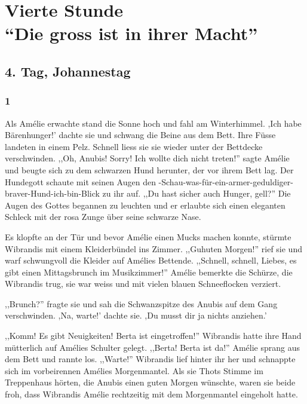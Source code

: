 \documentclass[11pt,titlepage,a5paper]{book}
\begin{document}
\part*{Vierte Stunde\\"`Die gross ist in ihrer Macht"'}

\chapter*{4. Tag, Johannestag}

\section*{1}

Als Amélie erwachte stand die Sonne hoch und fahl am Winterhimmel. ,Ich habe Bärenhunger!' dachte sie und schwang die Beine aus dem Bett. Ihre Füsse landeten in einem Pelz. Schnell liess sie sie wieder unter der Bettdecke verschwinden. ,,Oh, Anubis! Sorry! Ich wollte dich nicht treten!''  sagte Amélie und beugte sich zu dem schwarzen Hund herunter, der vor ihrem Bett lag. Der Hundegott schaute mit seinen Augen den -Schau-was-für-ein-armer-geduldiger-braver-Hund-ich-bin-Blick zu ihr auf. ,,Du hast sicher auch Hunger, gell?'' Die Augen des Gottes begannen zu leuchten und er erlaubte sich einen eleganten Schleck mit der rosa Zunge über seine schwarze Nase.

Es klopfte an der Tür und bevor Amélie einen Mucks machen konnte, stürmte Wibrandis mit einem Kleiderbündel ins Zimmer. ,,Guhuten Morgen!'' rief sie und warf schwungvoll die Kleider auf Amélies Bettende. ,,Schnell, schnell, Liebes, es gibt einen Mittagsbrunch im Musikzimmer!'' Amélie bemerkte die Schürze, die Wibrandis trug, sie war weiss und mit vielen blauen Schneeflocken verziert.

,,Brunch?'' fragte sie und sah die Schwanzspitze des Anubis auf dem Gang verschwinden. ,Na, warte!' dachte sie. ,Du musst dir ja nichts anziehen.' 

,,Komm! Es gibt Neuigkeiten! Berta ist eingetroffen!'' Wibrandis hatte ihre Hand mütterlich auf Amélies Schulter gelegt. ,,Berta! Berta ist da!'' Amélie sprang aus dem Bett und rannte los. ,,Warte!'' Wibrandis lief hinter ihr her und schnappte sich im vorbeirennen Amélies Morgenmantel. Als sie Thots Stimme im Treppenhaus hörten, die Anubis einen guten Morgen wünschte, waren sie beide froh, dass Wibrandis Amélie rechtzeitig mit dem Morgenmantel eingeholt hatte.
\end{document}
